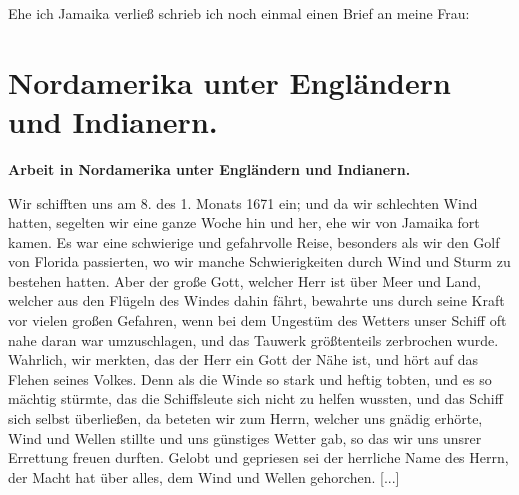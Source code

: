 Ehe ich Jamaika verließ schrieb ich noch einmal einen Brief
an meine Frau:



\chapter[Nordamerika unter Engländern und Indianern.]{Nordamerika unter Engländern und Indianern.}

\begin{center}
\textbf{Arbeit in Nordamerika unter Engländern und Indianern.}
\end{center}


Wir schifften uns am 8. des 1. Monats 1671 ein; und da
wir schlechten Wind hatten, segelten wir eine ganze Woche hin
und her, ehe wir von Jamaika fort kamen. Es war eine 
schwierige und gefahrvolle Reise, besonders als wir den Golf von
Florida passierten, wo wir manche Schwierigkeiten durch Wind
und Sturm zu bestehen hatten. Aber der große Gott, welcher
Herr ist über Meer und Land, welcher aus den Flügeln des
Windes dahin fährt, bewahrte uns durch seine Kraft vor vielen
großen Gefahren, wenn bei dem Ungestüm des Wetters unser
Schiff oft nahe daran war umzuschlagen, und das Tauwerk 
größtenteils zerbrochen wurde. Wahrlich, wir merkten, das der Herr ein
Gott der Nähe ist, und hört auf das Flehen seines Volkes. Denn
als die Winde so stark und heftig tobten, und es so mächtig
stürmte, das die Schiffsleute sich nicht zu helfen wussten, und
das Schiff sich selbst überließen, da beteten wir zum Herrn, welcher
uns gnädig erhörte, Wind und Wellen stillte und uns günstiges
Wetter gab, so das wir uns unsrer Errettung freuen durften.
Gelobt und gepriesen sei der herrliche Name des Herrn, der
Macht hat über alles, dem Wind und Wellen gehorchen. [...]

